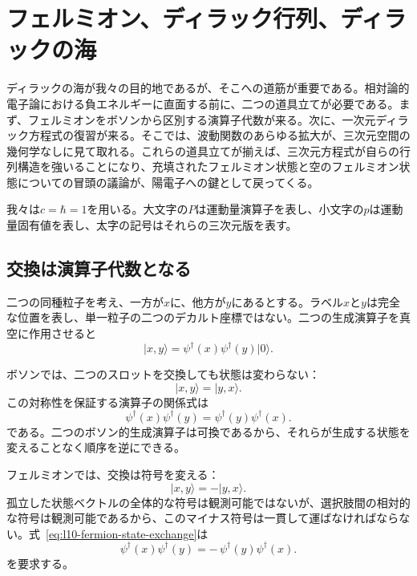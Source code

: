 \chapter{フェルミオン、ディラック行列、ディラックの海}

ディラックの海が我々の目的地であるが、そこへの道筋が重要である。相対論的電子論における負エネルギーに直面する前に、二つの道具立てが必要である。まず、フェルミオンをボソンから区別する演算子代数が来る。次に、一次元ディラック方程式の復習が来る。そこでは、波動関数のあらゆる拡大が、三次元空間の幾何学なしに見て取れる。これらの道具立てが揃えば、三次元方程式が自らの行列構造を強いることになり、充填されたフェルミオン状態と空のフェルミオン状態についての冒頭の議論が、陽電子への鍵として戻ってくる。

我々は\(c=\hbar=1\)を用いる。大文字の\(P\)は運動量演算子を表し、小文字の\(p\)は運動量固有値を表し、太字の記号はそれらの三次元版を表す。

\section{交換は演算子代数となる}

二つの同種粒子を考え、一方が\(x\)に、他方が\(y\)にあるとする。ラベル\(x\)と\(y\)は完全な位置を表し、単一粒子の二つのデカルト座標ではない。二つの生成演算子を真空に作用させると
\begin{equation}
\lvert x,y\rangle
=
\psi^\dagger(x)\psi^\dagger(y)\lvert0\rangle.
\label{eq:l10-two-particle-state}
\end{equation}

ボソンでは、二つのスロットを交換しても状態は変わらない：
\begin{equation}
\lvert x,y\rangle=\lvert y,x\rangle.
\end{equation}
この対称性を保証する演算子の関係式は
\begin{equation}
\psi^\dagger(x)\psi^\dagger(y)
=
\psi^\dagger(y)\psi^\dagger(x).
\label{eq:l10-boson-exchange}
\end{equation}
である。二つのボソン的生成演算子は可換であるから、それらが生成する状態を変えることなく順序を逆にできる。

フェルミオンでは、交換は符号を変える：
\begin{equation}
\lvert x,y\rangle=-\lvert y,x\rangle.
\label{eq:l10-fermion-state-exchange}
\end{equation}
孤立した状態ベクトルの全体的な符号は観測可能ではないが、選択肢間の相対的な符号は観測可能であるから、このマイナス符号は一貫して運ばなければならない。式~\eqref{eq:l10-fermion-state-exchange}は
\begin{equation}
\psi^\dagger(x)\psi^\dagger(y)
=
-\,\psi^\dagger(y)\psi^\dagger(x).
\label{eq:l10-fermion-operator-exchange}
\end{equation}
を要求する。

